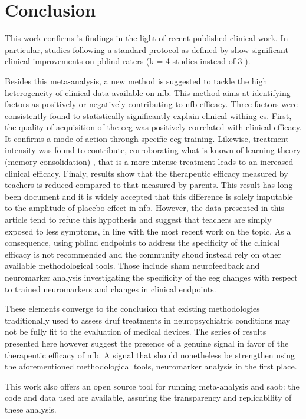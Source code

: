 

\section{Conclusion}


This work confirms \citet{Cortese2016}'s findings in the light of recent published clinical work.
In particular, studies following a standard protocol as defined by \citet{Arns2014} show significant clinical  improvements on \gls{pblind}
raters (k = 4 studies instead of 3 \citet{Cortese2016}).

Besides this meta-analysis, a new method is suggested to tackle the high heterogeneity of clinical data available on \gls{nfb}. This method aims at identifying factors as positively or negatively contributing to \gls{nfb} efficacy. 
Three factors were consistently found to statistically significantly explain clinical withing-\gls{es}.
First, the quality of acquisition of the \gls{eeg} was positively correlated with clinical efficacy. It confirms a mode of action through specific \gls{eeg} training.
Likewise, treatment intensity was found to contribute, corroborating what is known of learning theory (memory consolidation) \citep{Mowrer1960}, that is a more intense treatment leads to an increased clinical efficacy. Finaly,  results show that the therapeutic efficacy measured by teachers is reduced compared to  that measured by parents.
This result has long been document and it is widely accepted that this difference is solely imputable to the amplitude of placebo effect in \gls{nfb}. However, the data presented in this article tend to refute this hypothesis and suggest that teachers are simply exposed to less symptoms, in line with the most recent work on the topic. 
As a consequence, using \gls{pblind} endpoints to address the specificity of the clinical efficacy is not recommended and the community shoud instead rely on other available methodological tools. Those include  sham neurofeedback and neuromarker analysis investigating the specificity of the \gls{eeg} changes with respect to trained neuromarkers and changes in clinical endpoints.

These elements converge to the conclusion that existing methodologies traditionally used to assess druf treatments in neuropsychiatric conditions may not be fully fit to the evaluation of medical devices. The series of results presented here however suggest the presence of a genuine signal in favor of the therapeutic efficacy of \gls{nfb}. A signal that should nonetheless be strengthen using the aforementioned methodological tools, neuromarker analysis in the first place.

This work also offers an open source tool for running meta-analysis and \gls{saob}: the code and data used are available, assuring the transparency and replicability of these analysis. 

